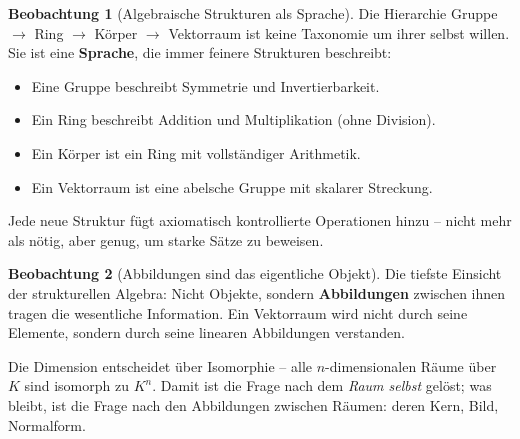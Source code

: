 ﻿\documentclass[a4paper,12pt]{report}
\theoremstyle{definition}
\newtheorem{beobachtung}{Beobachtung}
\begin{document}
\begin{beobachtung}[Algebraische Strukturen als Sprache]
    Die Hierarchie Gruppe $\to$ Ring $\to$ Körper $\to$ Vektorraum ist keine
    Taxonomie um ihrer selbst willen. Sie ist eine \textbf{Sprache}, die
    immer feinere Strukturen beschreibt:
    \begin{itemize}
        \item[-] Eine Gruppe beschreibt Symmetrie und Invertierbarkeit.
        \item[-] Ein Ring beschreibt Addition und Multiplikation (ohne Division).
        \item[-] Ein Körper ist ein Ring mit vollständiger Arithmetik.
        \item[-] Ein Vektorraum ist eine abelsche Gruppe mit skalarer Streckung.
    \end{itemize}
    Jede neue Struktur fügt axiomatisch kontrollierte Operationen hinzu --
    nicht mehr als nötig, aber genug, um starke Sätze zu beweisen.
\end{beobachtung}

\begin{beobachtung}[Abbildungen sind das eigentliche Objekt]
    Die tiefste Einsicht der strukturellen Algebra: Nicht Objekte, sondern
    \textbf{Abbildungen} zwischen ihnen tragen die wesentliche Information.
    Ein Vektorraum wird nicht durch seine Elemente, sondern durch seine
    linearen Abbildungen verstanden.

    Die Dimension entscheidet über Isomorphie -- alle $n$-dimensionalen
    Räume über $K$ sind isomorph zu $K^n$. Damit ist die Frage nach dem
    \emph{Raum selbst} gelöst; was bleibt, ist die Frage nach den
    Abbildungen zwischen Räumen: deren Kern, Bild, Normalform.
\end{beobachtung}
\end{document}
